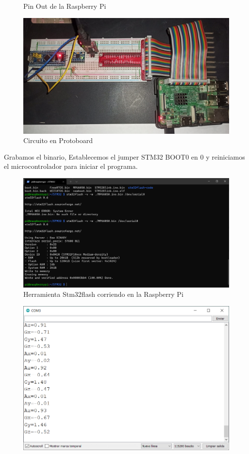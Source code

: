 \documentclass[12pt,oneside,spanish]{article}
\begin{document}
\begin{enumerate}
\begin{figure}[h!]
    \caption{Pin Out de la Raspberry Pi}
    \label{fig:my_label}
\end{figure}
\begin{figure}[h!]
    \centering
    \includegraphics[scale=0.3]{Flash/Raspberry.jpeg}
    \caption{Circuito en Protoboard}
    \label{fig:my_label}
\end{figure}
Grabamos el binario, Establecemos el jumper STM32 BOOT0 en 0 y reiniciamos el microcontrolador para iniciar el programa.
\begin{figure}[h!]
    \centering
    \includegraphics[scale=0.4]{Flash/Stm32flash.png}
    \caption{Herramienta Stm32flash corriendo en la Raspberry Pi}
    \label{fig:my_label}
\end{figure}
\begin{figure}[h!]
    \centering
    \includegraphics[scale=0.4]{Flash/SerialMonitor.png}

\end{figure}
\end{enumerate}
\end{document}
